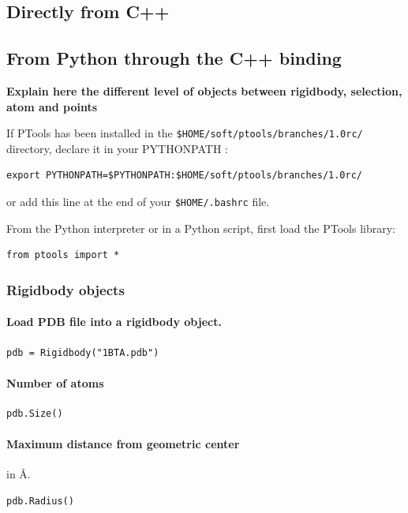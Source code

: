 \documentclass[12pt,a4paper]{article}
\begin{document}
\subsection{Directly from C++}

\subsection{From Python through the C++ binding}

\vspace*{1cm}
{\bf Explain here the different level of objects between rigidbody, selection, atom and points}
\vspace*{1cm}

If PTools has been installed in the {\tt \$HOME/soft/ptools/branches/1.0rc/} directory, 
declare it in your PYTHONPATH :

\begin{verbatim}
export PYTHONPATH=$PYTHONPATH:$HOME/soft/ptools/branches/1.0rc/
\end{verbatim}
or add this line at the end of your {\tt \$HOME/.bashrc} file.


From the Python interpreter or in a Python script, first load the PTools library:
\begin{verbatim}
from ptools import *
\end{verbatim}


\subsubsection{Rigidbody objects}

\paragraph{Load PDB file into a rigidbody object.}
\begin{verbatim}
pdb = Rigidbody("1BTA.pdb")
\end{verbatim}


\paragraph{Number of atoms}
\begin{verbatim}
pdb.Size()
\end{verbatim}


\paragraph{Maximum distance from geometric center} in \AA.
\begin{verbatim}
pdb.Radius()
\end{verbatim}
\end{document}
